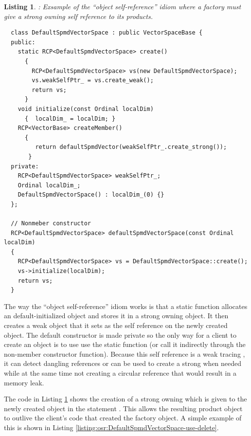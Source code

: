 \documentclass[pdf,ps2pdf,11pt]{SANDreport}
\newtheorem{listing}{Listing}
\begin{document}
\begin{listing}: Exsample of the ``object self-reference'' idiom where a
factory must give a strong owning {} self reference to its products.  \\
\label{listing:osr:DefaultSpmdVectorSpace}
{\small\begin{verbatim}
  class DefaultSpmdVectorSpace : public VectorSpaceBase {
  public:
    static RCP<DefaultSpmdVectorSpace> create()
      {
        RCP<DefaultSpmdVectorSpace> vs(new DefaultSpmdVectorSpace);
        vs.weakSelfPtr_ = vs.create_weak();
        return vs;
      }
    void initialize(const Ordinal localDim)
      {  localDim_ = localDim; }
    RCP<VectorBase> createMember()
      {
         return defaultSpmdVector(weakSelfPtr_.create_strong());
       }
  private:
    RCP<DefaultSpmdVectorSpace> weakSelfPtr_;
    Ordinal localDim_;
    DefaultSpmdVectorSpace() : localDim_(0) {}
  };

  // Nonmeber constructor
  RCP<DefaultSpmdVectorSpace> defaultSpmdVectorSpace(const Ordinal localDim)
  {
    RCP<DefaultSpmdVectorSpace> vs = DefaultSpmdVectorSpace::create();
    vs->initialize(localDim);
    return vs;
  }
\end{verbatim}}
\end{listing}


The way the ``object self-reference'' idiom works is that a static
function {} allocates an default-initialized
{} object and stores it in a strong
owning {} object.  It then creates a weak {}
object that it sets as the self reference on the newly created
{} object.  The default constructor is
made private so the only way for a client to create an
{} object is to use use the static
{} function (or call it indirectly through the
non-member constructor {} function).
Because this self reference is a weak tracing {}, it can
detect dangling references or can be used to create a strong
{} when needed while at the same time not creating a
circular reference that would result in a memory leak.

The code in Listing {}\ref{listing:osr:DefaultSpmdVectorSpace} shows
the creation of a strong owning {} which is given to the
newly created {} object in the statement
{}.  This
allows the resulting product {} object to
outlive the client's code that created the factory
{} object.  A simple example of this is
shown in Listing
{}\ref{listing:osr:DefaultSpmdVectorSpace-use-delete}.
\end{document}
